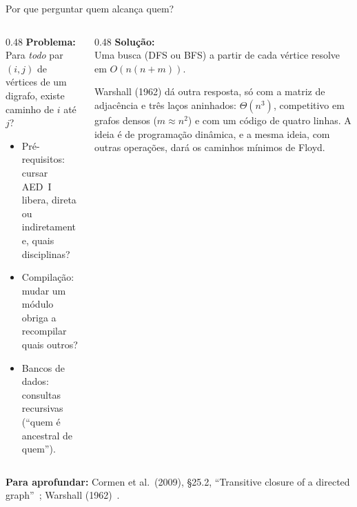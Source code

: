 \documentclass[aspectratio=169,xcolor=table]{beamer}
\newcommand{\fonte}[1]{%
  \vfill
  {\tiny\color{gray!55!black}\textbf{Para aprofundar:} #1\par}%
}
\begin{document}
\begin{frame}{Por que perguntar quem alcança quem?}
  \begin{columns}[T]
    \begin{column}{0.48\textwidth}
      \textbf{Problema:}\\[2pt]
      \scriptsize Para \emph{todo} par $(i,j)$ de vértices de um digrafo, existe caminho de
      $i$ até $j$?
      \begin{itemize}\scriptsize
        \item Pré-requisitos: cursar AED~I libera, direta ou indiretamente, quais disciplinas?
        \item Compilação: mudar um módulo obriga a recompilar quais outros?
        \item Bancos de dados: consultas recursivas (``quem é ancestral de quem'').
      \end{itemize}
    \end{column}
    \begin{column}{0.48\textwidth}
      \textbf{Solução:}\\[2pt]
      \scriptsize Uma busca (DFS ou BFS) a partir de cada vértice resolve em $O(n(n+m))$.
      \medskip

      Warshall (1962) dá outra resposta, só com a matriz de adjacência e três laços
      aninhados: $\Theta(n^3)$, competitivo em grafos densos ($m \approx n^2$) e com um
      código de quatro linhas. A ideia é de programação dinâmica, e a mesma ideia, com outras
      operações, dará os caminhos mínimos de Floyd.
    \end{column}
  \end{columns}
  \fonte{Cormen et al.\ (2009), \S 25.2, ``Transitive closure of a directed
    graph''~\cite{cormen2009introduction}; Warshall (1962)~\cite{warshall1962theorem}.}
\end{frame}
\end{document}
